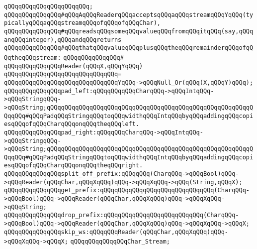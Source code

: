 \verb|qQQqqQQqqQQqqQQqqQQqqQQq;|\newline
\newline
\newline
\verb|qQQqqQQqqQQqqQQq#qQQqAqQQqReaderqQQqacceptsqQQqaqQQqstreamqQQqYqQQq(typicallyqQQqaqQQqstreamqQQqofqQQqofqQQqChar),|\newline
\verb|qQQqqQQqqQQqqQQq#qQQqreadsqQQqsomeqQQqvalueqQQqfromqQQqitqQQq(say,qQQqanqQQqinteger),qQQqandqQQqreturns|\newline
\verb|qQQqqQQqqQQqqQQq#qQQqthatqQQqvalueqQQqplusqQQqtheqQQqremainderqQQqofqQQqtheqQQqstream:|\newline
\verb|qQQqqQQqqQQqqQQq#|\newline
\verb|qQQqqQQqqQQqqQQqReader(qQQqX,qQQqYqQQq)|\newline
\verb|qQQqqQQqqQQqqQQqqQQqqQQqqQQqqQQq=|\newline
\verb|qQQqqQQqqQQqqQQqqQQqqQQqqQQqqQQqYqQQq->qQQqNull_Or(qQQq(X,qQQqY)qQQq);|\newline
\newline
\verb|qQQqqQQqqQQqqQQqpad_left:qQQqqQQqqQQqCharqQQq->qQQqIntqQQq->qQQqStringqQQq->qQQqString;qQQqqQQqqQQqqQQqqQQqqQQqqQQqqQQqqQQqqQQqqQQqqQQqqQQqqQQqqQQqqQQq#qQQqPadqQQqStringqQQqtoqQQqwidthqQQqIntqQQqbyqQQqaddingqQQqcopiesqQQqofqQQqCharqQQqonqQQqtheqQQqleft.|\newline
\verb|qQQqqQQqqQQqqQQqpad_right:qQQqqQQqCharqQQq->qQQqIntqQQq->qQQqStringqQQq->qQQqString;qQQqqQQqqQQqqQQqqQQqqQQqqQQqqQQqqQQqqQQqqQQqqQQqqQQqqQQqqQQqqQQq#qQQqPadqQQqStringqQQqtoqQQqwidthqQQqIntqQQqbyqQQqaddingqQQqcopiesqQQqofqQQqCharqQQqonqQQqtheqQQqright.|\newline
\newline
\verb|qQQqqQQqqQQqqQQqsplit_off_prefix:qQQqqQQq(CharqQQq->qQQqBool)qQQq->qQQqReader(qQQqChar,qQQqXqQQq)qQQq->qQQqXqQQq->qQQq(String,qQQqX);|\newline
\verb|qQQqqQQqqQQqqQQqget_prefix:qQQqqQQqqQQqqQQqqQQqqQQqqQQqqQQq(CharqQQq->qQQqBool)qQQq->qQQqReader(qQQqChar,qQQqXqQQq)qQQq->qQQqXqQQq->qQQqString;|\newline
\verb|qQQqqQQqqQQqqQQqdrop_prefix:qQQqqQQqqQQqqQQqqQQqqQQqqQQq(CharqQQq->qQQqBool)qQQq->qQQqReader(qQQqChar,qQQqXqQQq)qQQq->qQQqXqQQq->qQQqX;|\newline
\newline
\verb|qQQqqQQqqQQqqQQqskip_ws:qQQqqQQqReader(qQQqChar,qQQqXqQQq)qQQq->qQQqXqQQq->qQQqX;|\newline
\newline
\verb|qQQqqQQqqQQqqQQqChar_Stream;|\newline
